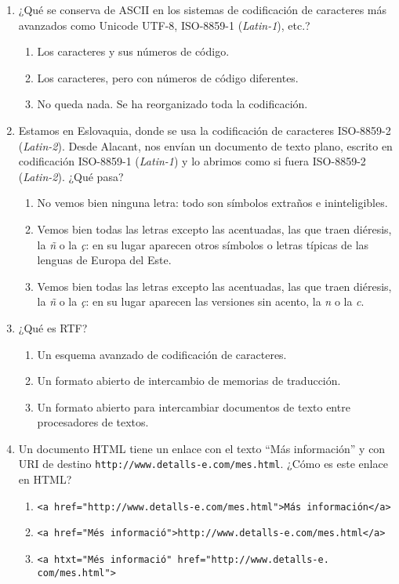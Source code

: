{\begin{enumerate}
\item ¿Qué se conserva de ASCII en los sistemas de codificación de caracteres más avanzados como Unicode UTF-8, ISO-8859-1 (\emph{Latin-1}), etc.? \begin{enumerate} \item Los caracteres y sus números de código. \item Los caracteres, pero con números de código diferentes. \item No  queda nada. Se ha reorganizado toda la codificación. \end{enumerate} 

\item Estamos en Eslovaquia, donde se usa la codificación de caracteres ISO-8859-2 (\emph{Latin-2}). Desde Alacant, nos envían un documento de texto plano, escrito en codificación ISO-8859-1 (\emph{Latin-1}) y lo abrimos como si fuera ISO-8859-2 (\emph{Latin-2}). ¿Qué pasa? \begin{enumerate} \item No vemos bien ninguna letra: todo son símbolos extraños e ininteligibles. \item Vemos bien todas las letras excepto las acentuadas, las que traen diéresis, la  \emph{ñ} o la \emph{ç}: en su lugar aparecen otros símbolos o letras típicas de las lenguas de Europa del Este. \item Vemos bien todas las letras excepto las acentuadas, las que traen diéresis, la \emph{ñ} o la \emph{ç}: en su lugar aparecen las versiones sin acento, la  \emph{n}  o la \emph{c}. \end{enumerate} 

\item ¿Qué es RTF? \begin{enumerate} \item Un esquema avanzado de codificación de caracteres. \item Un formato abierto de intercambio de memorias de traducción. \item Un formato abierto para intercambiar documentos de texto entre procesadores de textos. \end{enumerate} 

\item Un documento HTML tiene un enlace con el texto ``Más información'' y con URI de destino \verb|http://www.detalls-e.com/mes.html|. ¿Cómo es este enlace en HTML? \begin{enumerate} \item \verb|<a href="http://www.detalls-e.com/mes.html">Más información</a>| \item \verb|<a href="Més informació">http://www.detalls-e.com/mes.html</a>| \item \verb|<a htxt="Més informació" href="http://www.detalls-e.| \verb|com/mes.html">| \end{enumerate} 


\end{enumerate}}
